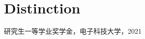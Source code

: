\documentclass{article}
\newcommand{\cvsubsection}[1]{\subsection*{\hspace{1.45em}#1}}
\begin{document}

















\section*{Distinction}
\indent


研究生一等学业奖学金，电子科技大学，2021






\end{document}
